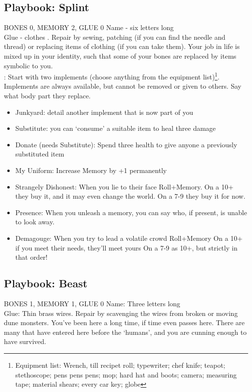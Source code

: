\subsection{Playbook: Splint}
BONES 0, MEMORY 2, GLUE 0  
Name - six letters long
\\ Glue - clothes . Repair by sewing, patching (if you can find the needle and thread) or replacing items of clothing (if you can take them). 		
Your job in life is mixed up in your identity, such that some of your bones are replaced by items symbolic to you. 
\\
: Start with two implements (choose anything from the equipment list)\footnote{Equipment list: Wrench, till recipet roll; typewriter; chef knife; teapot; stethoscope; pens pens pens; mop; hard hat and boots; camera; measuring tape; material shears; every car key; globe}. Implements are always available, but cannot be removed or given to others. Say what body part they replace.
\begin{itemize}
\item  Junkyard: detail another implement that is now part of you
\item  Substitute: you can `consume' a suitable item to heal three damage
\item  Donate (needs Substitute): Spend three health to give anyone a previously substituted item
\item My Uniform: Increase Memory by +1 permanently
\item  Strangely Dishonest: When you lie to their face Roll+Memory. 
\myitem On a 10+ they buy it, and it may even change the world. 
\myitemend On a 7-9 they buy it for now.
\item Presence: When you unleash a memory, you can say who, if present, is unable to look away. 
\item Demagouge: When you try to lead a volatile crowd Roll+Memory
\myitem On a 10+ if you meet their needs, they'll meet yours
\myitemend On a 7-9 as 10+, but strictly in that order!
\end{itemize}


\newpage
\subsection{Playbook: Beast}
BONES 1, MEMORY 1, GLUE 0  
Name: Three letters long
\\Glue: Thin brass wires. Repair by scavenging the wires from broken or moving dune monsters.
You've been here a long time, if time even passes here. There are many that have entered here before the `humans', and you are cunning enough to have survived.

